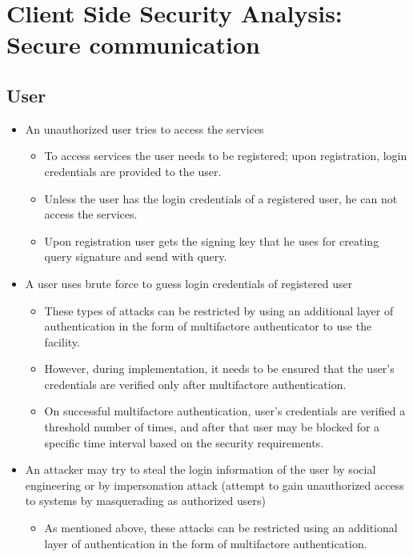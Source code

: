 \newpage

\section{Client Side Security Analysis: Secure communication}
\label{possible-attacks_in_components}

\subsection{User}
\begin{itemize}
    \item An unauthorized user tries to access the services
          \begin{itemize}
              \item To access services the user needs to be registered; upon registration, login credentials are provided to the user.
              \item Unless the user has the login credentials of a registered user, he can not access the services.
              \item Upon registration user gets the signing key that he uses for creating query signature and send with query.
          \end{itemize}

    \item A user uses brute force to guess login credentials of registered user
          \begin{itemize}
              \item These types of attacks can be restricted by using an additional layer of authentication in the form of multifactore authenticator to use the facility.
              \item However, during implementation, it needs to be ensured that the user's credentials are verified only after multifactore authentication.
              \item On successful multifactore authentication, user's credentials are verified a threshold number of times, and after that user may be blocked for a specific time interval based on the security requirements.
          \end{itemize}

    \item An attacker may try to steal the login information of the user by social engineering or by impersonation attack (attempt to gain unauthorized access to systems by masquerading as authorized users)
          \begin{itemize}
              \item As mentioned above, these attacks can be restricted using an additional layer of authentication in the form of multifactore authentication.
          \end{itemize}


\end{itemize}
